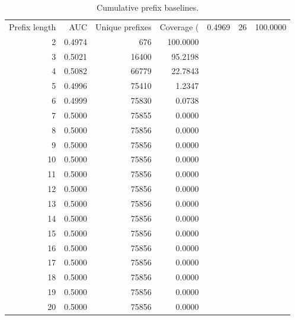 \begin{table}
\caption{Cumulative prefix baselines.}
\label{tab:prefix_baselines}
\begin{tabular}{rrrr}
\toprule
Prefix length & AUC & Unique prefixes & Coverage (%
 & 0.4969 & 26 & 100.0000 \\
2 & 0.4974 & 676 & 100.0000 \\
3 & 0.5021 & 16400 & 95.2198 \\
4 & 0.5082 & 66779 & 22.7843 \\
5 & 0.4996 & 75410 & 1.2347 \\
6 & 0.4999 & 75830 & 0.0738 \\
7 & 0.5000 & 75855 & 0.0000 \\
8 & 0.5000 & 75856 & 0.0000 \\
9 & 0.5000 & 75856 & 0.0000 \\
10 & 0.5000 & 75856 & 0.0000 \\
11 & 0.5000 & 75856 & 0.0000 \\
12 & 0.5000 & 75856 & 0.0000 \\
13 & 0.5000 & 75856 & 0.0000 \\
14 & 0.5000 & 75856 & 0.0000 \\
15 & 0.5000 & 75856 & 0.0000 \\
16 & 0.5000 & 75856 & 0.0000 \\
17 & 0.5000 & 75856 & 0.0000 \\
18 & 0.5000 & 75856 & 0.0000 \\
19 & 0.5000 & 75856 & 0.0000 \\
20 & 0.5000 & 75856 & 0.0000 \\
\bottomrule
\end{tabular}
\end{table}
